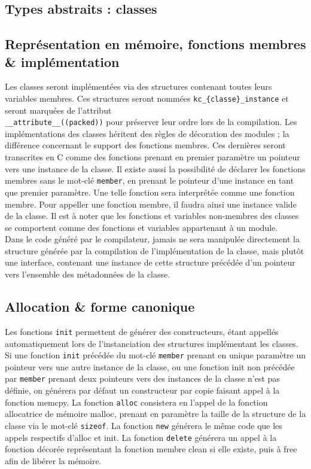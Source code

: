 \documentclass[12pt,a4paper]{article}
\def\code#1{\texttt{#1}}
\begin{document}
\begin{NoHyper}
\section{Types abstraits : classes}

\subsection{Représentation en mémoire, fonctions membres \& implémentation}
Les classes seront implémentées via des structures contenant toutes leurs variables membres. Ces structures seront nommées \code{kc\_\{classe\}\_instance} et seront marquées de l'attribut\\ \code{\_\_attribute\_\_((packed))} pour préserver leur ordre lors de la compilation. Les implémentations des classes héritent des règles de décoration des modules ; la différence concernant le support des fonctions membres. Ces dernières seront transcrites en C comme des fonctions prenant en premier paramètre un pointeur vers une instance de la classe. Il existe aussi la possibilité de déclarer les fonctions membres sans le mot-clé \code{member}, en prenant le pointeur d'une instance en tant que premier paramètre. Une telle fonction sera interprétée comme une fonction membre. Pour appeller une fonction membre, il faudra ainsi une instance valide de la classe. Il est à noter que les fonctions et variables non-membres des classes se comportent comme des fonctions et variables appartenant à un module. \\
Dans le code généré par le compilateur, jamais ne sera manipulée directement la structure générée par la compilation de l'implémentation de la classe, mais plutôt une interface, contenant une instance de cette structure précédée d'un pointeur vers l'ensemble des métadonnées de la classe.

\subsection{Allocation \& forme canonique}
Les fonctions \code{init} permettent de générer des constructeurs, étant appellés automatiquement lors de l'instanciation des structures implémentant les classes. Si une fonction \code{init} précédée du mot-clé \code{member} prenant en unique paramètre un pointeur vers une autre instance de la classe, ou une fonction init non précédée par \code{member} prenant deux pointeurs vers des instances de la classe n'est pas définie, on générera par défaut un constructeur par copie faisant appel à la fonction memcpy. La fonction \code{alloc} consistera en l'appel de la fonction allocatrice de mémoire malloc, prenant en paramètre la taille de la structure de la classe via le mot-clé \code{sizeof}. La fonction \code{new} générera le même code que les appels respectifs d'alloc et init. La fonction \code{delete} générera un appel à la fonction décorée représentant la fonction membre clean si elle existe, puis à free afin de libérer la mémoire.


\end{NoHyper}
\end{document}
